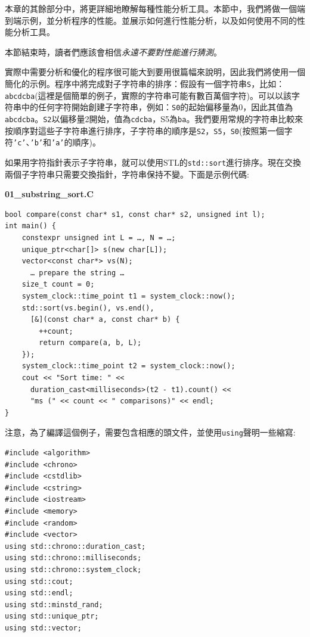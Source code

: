 
本章的其餘部分中，將更詳細地瞭解每種性能分析工具。本節中，我們將做一個端到端示例，並分析程序的性能。並展示如何進行性能分析，以及如何使用不同的性能分析工具。

本節結束時，讀者們應該會相信\textit{永遠不要對性能進行猜測}。

實際中需要分析和優化的程序很可能大到要用很篇幅來說明，因此我們將使用一個簡化的示例。程序中將完成對子字符串的排序：假設有一個字符串\texttt{S}，比如：\texttt{abcdcba}(這裡是個簡單的例子，實際的字符串可能有數百萬個字符)。可以以該字符串中的任何字符開始創建子字符串，例如：\texttt{S0}的起始偏移量為0，因此其值為\texttt{abcdcba}。\texttt{S2}以偏移量2開始，值為\texttt{cdcba}，S5為\texttt{ba}。我們要用常規的字符串比較來按順序對這些子字符串進行排序，子字符串的順序是\texttt{S2}，\texttt{S5}，\texttt{S0}(按照第一個字符\texttt{'c'}、\texttt{'b'}和\texttt{'a'}的順序)。

如果用字符指針表示子字符串，就可以使用STL的\texttt{std::sort}進行排序。現在交換兩個子字符串只需要交換指針，字符串保持不變。下面是示例代碼:

\noindent
\textbf{01\_substring\_sort.C}
\begin{lstlisting}[style=styleCXX]
bool compare(const char* s1, const char* s2, unsigned int l);
int main() {
	constexpr unsigned int L = …, N = …;
	unique_ptr<char[]> s(new char[L]);
	vector<const char*> vs(N);
	  … prepare the string …
	size_t count = 0;
	system_clock::time_point t1 = system_clock::now();
	std::sort(vs.begin(), vs.end(),
	  [&](const char* a, const char* b) {
		++count;
		return compare(a, b, L);
	});
	system_clock::time_point t2 = system_clock::now();
	cout << "Sort time: " <<
	  duration_cast<milliseconds>(t2 - t1).count() <<
	  "ms (" << count << " comparisons)" << endl;
}
\end{lstlisting}

注意，為了編譯這個例子，需要包含相應的頭文件，並使用\texttt{using}聲明一些縮寫:

\begin{lstlisting}[style=styleCXX]
#include <algorithm>
#include <chrono>
#include <cstdlib>
#include <cstring>
#include <iostream>
#include <memory>
#include <random>
#include <vector>
using std::chrono::duration_cast;
using std::chrono::milliseconds;
using std::chrono::system_clock;
using std::cout;
using std::endl;
using std::minstd_rand;
using std::unique_ptr;
using std::vector;
\end{lstlisting}

